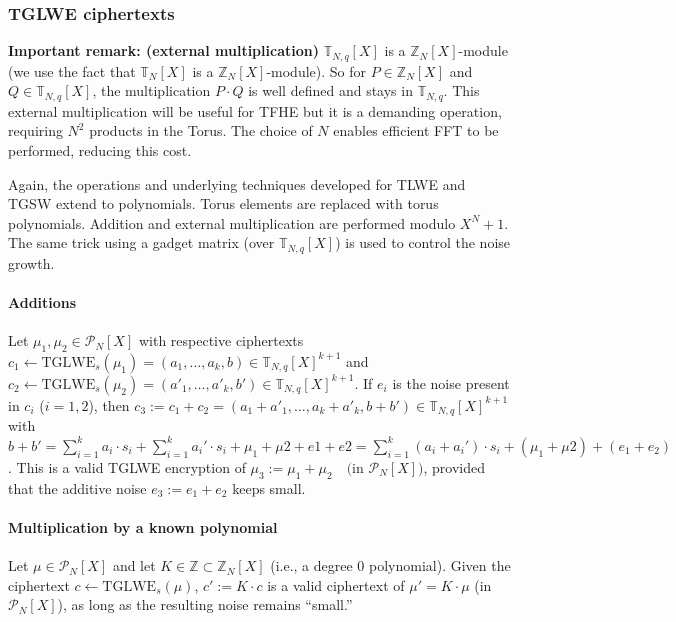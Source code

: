 \documentclass{article}
\newcommand{\Z}{\mathbb{Z}}
\newcommand{\T}{\mathbb{T}}
\newcommand{\Pcal}{\mathcal{P}}
\theoremstyle{definition}
\theoremstyle{Theorem}
\begin{document}
\subsubsection{TGLWE ciphertexts}

\textbf{Important remark: (external multiplication)}
$\T_{N,q}[X]$ is a $\Z_{N}[X]$-module (we use the fact that $\T_N[X]$ is a $\Z_N[X]$-module). 
So for $P\in \Z_{N}[X]$ and $Q\in \T_{N,q}[X]$, the multiplication $P\cdot Q$ is well defined and stays in $\T_{N,q}$. 
This external multiplication will be useful for TFHE but it is a demanding operation, requiring $N^2$ products in the Torus. The choice of $N$ enables efficient FFT to be performed, reducing this cost. 

 Again, the operations and underlying techniques developed for TLWE and TGSW extend to polynomials. Torus elements are replaced with torus polynomials. Addition and external multiplication are performed modulo $X^N +1$. The same trick using a gadget matrix (over $\T_{N,q}[X]$) is used to control the noise growth.

 \paragraph{Additions}
 
Let $\mu_1, \mu_2 \in \Pcal_N[X]$ with respective ciphertexts $c_1 \gets \text{TGLWE}_s(\mu_1) = (a_1, \ldots, a_k, b) \in \mathbb{T}_{N,q}[X]^{k+1}$
and 
$c_2 \gets \text{TGLWE}_s(\mu_2) = (a'_1, \ldots, a'_k, b') \in \mathbb{T}_{N,q}[X]^{k+1}$. 
If $e_i$ is the noise present in $c_i$ ($i=1,2$), then 
$c_3 := c_1 + c_2 = (a_1 + a'_1, \ldots, a_k + a'_k, b + b') \in \mathbb{T}_{N,q}[X]^{k+1}$
with $b+b'=\sum_{i=1}^ka_i\cdot s_i + \sum_{i=1}^ka_i'\cdot s_i + \mu_1 + \mu2 + e1+e2 = \sum_{i=1}^k(a_i+a_i')\cdot s_i + (\mu_1 + \mu2) + (e_1+e_2)$. 
This is a valid TGLWE encryption of 
$\mu_3 := \mu_1 + \mu_2 \quad \text{(in } \Pcal_N[X]\text{)}$,
provided that the additive noise $e_3 := e_1 + e_2$ keeps small. 

\paragraph{Multiplication by a known polynomial}

Let $\mu \in \Pcal_N[X]$ and let $K \in \mathbb{Z} \subset \mathbb{Z}_N[X]$ 
(i.e., a degree 0 polynomial). 
Given the ciphertext $c \gets \text{TGLWE}_s(\mu)$, $c' := K \cdot c$
is a valid ciphertext of $\mu' = K \cdot \mu$ (in $\Pcal_N[X]$), as long as the resulting noise remains ``small.''
\end{document}
